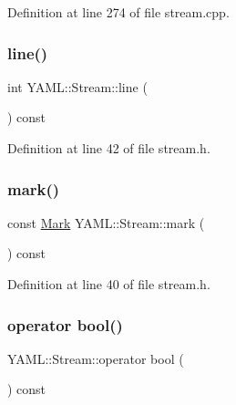 Definition at line 274 of file stream.\+cpp.

\mbox{\label{class_y_a_m_l_1_1_stream_a871e35c3a11e57e33b26c62be7db6d72}} 
\subsubsection{\texorpdfstring{line()}{line()}}
{\footnotesize\ttfamily int Y\+A\+M\+L\+::\+Stream\+::line (\begin{DoxyParamCaption}{ }\end{DoxyParamCaption}) const\hspace{0.3cm}{\ttfamily [inline]}}



Definition at line 42 of file stream.\+h.

\mbox{\label{class_y_a_m_l_1_1_stream_a1984b6def1e7f09e8be1e2ded43e7c22}} 
\subsubsection{\texorpdfstring{mark()}{mark()}}
{\footnotesize\ttfamily const \mbox{\hyperlink{struct_y_a_m_l_1_1_mark}{Mark}} Y\+A\+M\+L\+::\+Stream\+::mark (\begin{DoxyParamCaption}{ }\end{DoxyParamCaption}) const\hspace{0.3cm}{\ttfamily [inline]}}



Definition at line 40 of file stream.\+h.

\mbox{\label{class_y_a_m_l_1_1_stream_add3d15ba6db6d1b6d84294fbe6534d31}} 
\subsubsection{\texorpdfstring{operator bool()}{operator bool()}}
{\footnotesize\ttfamily Y\+A\+M\+L\+::\+Stream\+::operator bool (\begin{DoxyParamCaption}{ }\end{DoxyParamCaption}) const}



